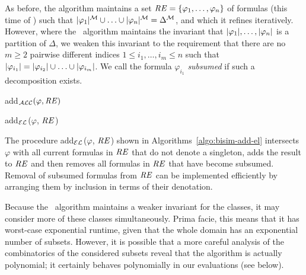 As before, the algorithm maintains a set $\mathit{RE} = \{\varphi_1,\ldots,\varphi_n\}$ of
formulas (this time of \el) such that $|\varphi_1|^{\mathcal{M}} \cup \ldots \cup
|\varphi_n|^{\mathcal{M}} = \Delta^{\mathcal{M}}$, and which it refines iteratively.  However,
where the \alc\ algorithm maintains the invariant that
$|\varphi_1|,\ldots,|\varphi_n|$ is a partition of $\Delta$, we
weaken this invariant to the requirement that there are no $m \geq 2$
pairwise different indices $1 \leq i_1,\ldots,i_m \leq n$ such that
$|\varphi_{i_1}| = |\varphi_{i_2}| \cup \ldots \cup
|\varphi_{i_m}|$.  We call the formula $\varphi_{i_1}$ \emph{subsumed} if
such a decomposition exists.

\begin{algorithm}[t]
\caption{add$_\mathcal{ALC}(\varphi,\mathit{RE})$}
\label{algo:bisim-add-alc}
\end{algorithm}
%
\begin{algorithm}[t]
\dontprintsemicolon
\caption{add$_\mathcal{EL}$($\varphi$, $\mathit{RE}$)}
\label{algo:bisim-add-el}
\end{algorithm}

The procedure add$_\mathcal{EL}$($\varphi$, $\mathit{RE}$) shown in Algorithms~\ref{algo:bisim-add-el} intersects $\varphi$ with all current formulas in $\mathit{RE}$
that do not denote a singleton, adds the result to $\mathit{RE}$ and then
removes all formulas in $\mathit{RE}$ that have become subsumed.  Removal of
subsumed formulas from $\mathit{RE}$ can be implemented efficiently by arranging
them by inclusion in terms of their denotation.

Because the \el\ algorithm maintains a weaker invariant
for the classes, it may consider more of these classes simultaneously.
Prima facie, this means that it has worst-case exponential runtime,
given that the whole domain has an exponential number of subsets.
However, it is possible that a more careful analysis of the
combinatorics of the considered subsets reveal that the algorithm is
actually polynomial; it certainly behaves polynomially in our
evaluations (see below).


